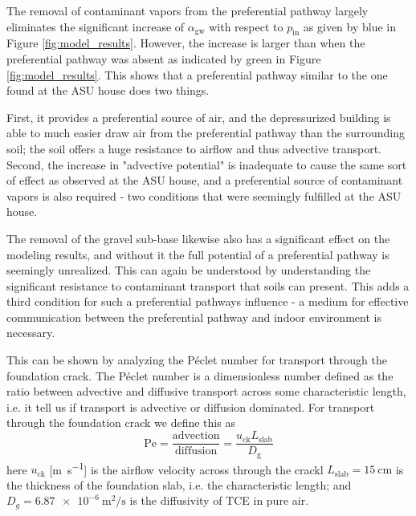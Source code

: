 The removal of contaminant vapors from the preferential pathway largely eliminates the significant increase of $\alpha_\mathrm{gw}$ with respect to $p_\mathrm{in}$ as given by blue in Figure \ref{fig:model_results}.
However, the increase is larger than when the preferential pathway was absent as indicated by green in Figure \ref{fig:model_results}.
This shows that a preferential pathway similar to the one found at the ASU house does two things.\par

First, it provides a preferential source of air, and the depressurized building is able to much easier draw air from the preferential pathway than the surrounding soil; the soil offers a huge resistance to airflow and thus advective transport.
Second, the increase in "advective potential" is inadequate to cause the same sort of effect as observed at the ASU house, and a preferential source of contaminant vapors is also required - two conditions that were seemingly fulfilled at the ASU house.\par

The removal of the gravel sub-base likewise also has a significant effect on the modeling results, and without it the full potential of a preferential pathway is seemingly unrealized.
This can again be understood by understanding the significant resistance to contaminant transport that soils can present.
This adds a third condition for such a preferential pathways influence - a medium for effective communication between the preferential pathway and indoor environment is necessary.\par

This can be shown by analyzing the Péclet number for transport through the foundation crack.
The Péclet number is a dimensionless number defined as the ratio between advective and diffusive transport across some characteristic length, i.e. it tell us if transport is advective or diffusion dominated.
For transport through the foundation crack we define this as
\begin{equation}
  \mathrm{Pe} = \frac{\mathrm{advection}}{\mathrm{diffusion}} = \frac{u_\mathrm{ck} L_\mathrm{slab}}{D_\mathrm{g}}
\end{equation}
here $u_\mathrm{ck}$ [\si{\metre\per\second}] is the airflow velocity across through the crackl
$L_\mathrm{slab} = \SI{15}{\centi\metre}$ is the thickness of the foundation slab, i.e. the characteristic length;
and $D_g = \SI{6.87e-6}{\metre\squared\per\second}$ is the diffusivity of TCE in pure air.\par

